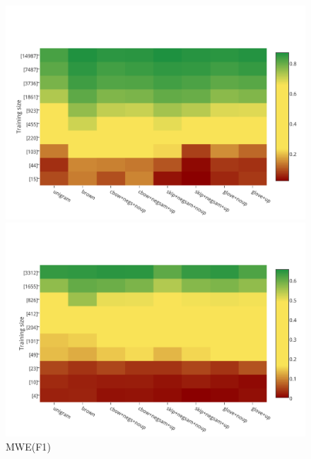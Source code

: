 \documentclass{beamer}
\newcommand{\task}[1]{\textsf{#1}\xspace}
\newcommand{\ner}{\task{NER}}
\newcommand{\mwe}{\task{MWE}}
\newcommand{\evmeasure}[1]{\textsc{#1}\xspace}
\newcommand{\fscore}{\evmeasure{F1}}
\begin{document}
\begin{frame}[plain]
\begin{columns}
\begin{figure}
    \includegraphics[scale=0.22]{../plots/map-ner-color-invert}    	
	\caption{\ner (\fscore)}	
	\vspace{-0.3cm}
    \includegraphics[scale=0.22]{../plots/map-mwe-color-invert}
	\caption{\mwe (\fscore)}	
     \end{figure}
\end{columns}
\end{frame}
\end{document}
